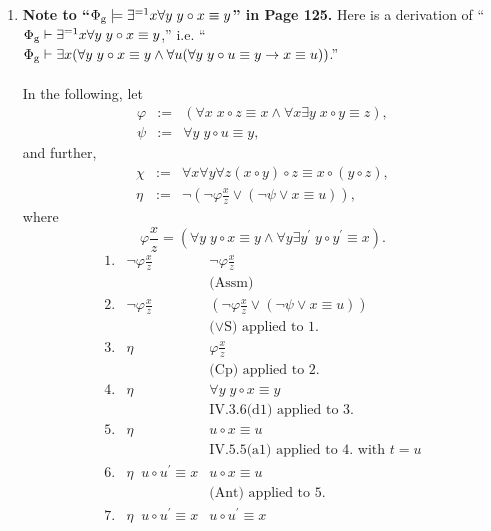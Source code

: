 \begin{enumerate}[1.]
\item \textbf{Note to ``$\Phi_{\mbox{\scriptsize g}} \models \exists^{=1}x \forall y \; y \circ x \equiv y$'' in Page 125.} Here is a derivation of ``$\Phi_{\mbox{\scriptsize g}} \vdash \exists^{=1}x \forall y \; y \circ x \equiv y$,'' i.e. ``$\Phi_{\mbox{\scriptsize g}} \vdash \exists x (\forall y \; y \circ x \equiv y \land \forall u (\forall y \; y \circ u \equiv y \rightarrow x \equiv u))$.''\\
\\
In the following, let
\[
\begin{array}{lll}
\varphi & := & (\forall x \; x \circ z \equiv x \land \forall x \exists y \; x \circ y \equiv z), \\
\psi    & := & \forall y \; y \circ u \equiv y,
\end{array}
\]
and further,
\[
\begin{array}{lll}
\chi & := & \forall x \forall y \forall z (x \circ y) \circ z \equiv x \circ (y \circ z),\\
\eta & := & \neg (\neg \varphi\frac{x}{z} \lor (\neg \psi \lor x \equiv u)),
\end{array}
\]
where
\[
\varphi\frac{x}{z} = (\forall y \; y \circ x \equiv y \land \forall y \exists y^\prime \; y \circ y^\prime \equiv x).
\]
\[
\begin{array}{lll}
1. & \neg \varphi\frac{x}{z} & \neg \varphi\frac{x}{z} \\
\  & \               & \mbox{(Assm)} \\
2. & \neg \varphi\frac{x}{z} & (\neg \varphi\frac{x}{z} \lor (\neg \psi \lor x \equiv u)) \\
\  & \               & \mbox{($\lor$S) applied to 1.} \\
3. & \eta & \varphi\frac{x}{z} \\
\  & \ & \mbox{(Cp) applied to 2.} \\
4. & \eta & \forall y \; y \circ x \equiv y \\
\  & \ & \mbox{IV.3.6(d1) applied to 3.} \\
5. & \eta & u \circ x \equiv u \\
\  & \ & \mbox{IV.5.5(a1) applied to 4. with $t = u$} \\
6. & \eta \;\; u \circ u^\prime \equiv x & u \circ x \equiv u \\
\  & \ & \mbox{(Ant) applied to 5.} \\
7. & \eta \;\; u \circ u^\prime \equiv x & u \circ u^\prime \equiv x \\

\end{array}\]
\end{enumerate}
